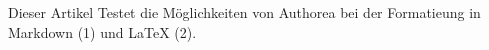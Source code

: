 Dieser Artikel Testet die Möglichkeiten von Authorea bei der Formatieung in Markdown (1) und LaTeX (2).
